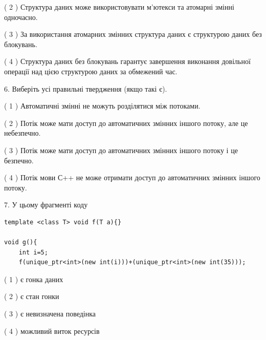 \documentclass[12pt, ukrainian]{article}
\begin{document}
\begin {large}
{( 2 ) Структура даних може використовувати м’ютекси та атомарні змінні одночасно.%

( 3 ) За використання атомарних змінних структура даних є структурою даних без блокувань.%

( 4 ) Структура даних без блокувань гарантує завершення виконання довільної операції над цією структурою даних за обмежений час.%
\newpage



\vspace{5mm}
6. Виберіть усі правильні твердження (якщо такі є).\par
\vspace{2mm}

( 1 ) Автоматичні змінні не можуть розділятися між потоками.%

( 2 ) Потік може мати доступ до автоматичних змінних іншого потоку, але це небезпечно.%

( 3 ) Потік може мати доступ до автоматичних змінних іншого потоку і це безпечно.%

( 4 ) Потік мови С++ не може отримати доступ до автоматичних змінних іншого потоку.%


\vspace{5mm}
7. У цьому фрагменті коду
\begin{verbatim}
template <class T> void f(T a){}

void g(){
    int i=5;
    f(unique_ptr<int>(new int(i)))+(unique_ptr<int>(new int(35)));
\end{verbatim}
( 1 ) є гонка даних%

( 2 ) є стан гонки%

( 3 ) є невизначена поведінка%

( 4 ) можливий виток ресурсів%
}
\end {large}
\end{document}
